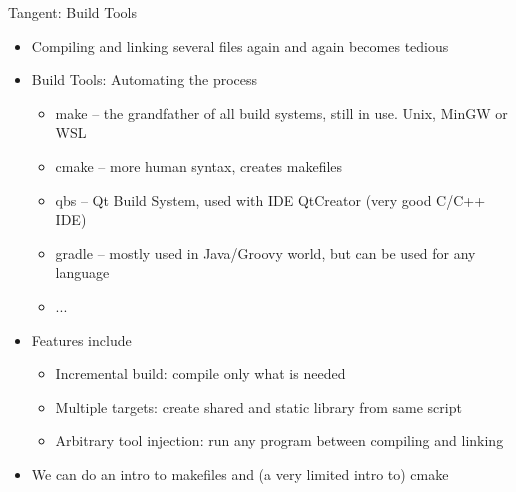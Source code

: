 \begin{frame}{Tangent: Build Tools}
%
\begin{itemize}
\item Compiling and linking several files again and again becomes tedious
\item Build Tools: Automating the process
	\begin{itemize}
	\item make -- the grandfather of all build systems, still in use. Unix, MinGW or WSL
	\item cmake -- more human syntax, creates makefiles
	\item qbs -- Qt Build System, used with IDE QtCreator (very good C/C++ IDE)
	\item gradle -- mostly used in Java/Groovy world, but can be used for any language
	\item ...
	\end{itemize}
\item Features include
	\begin{itemize}
	\item Incremental build: compile only what is needed
	\item Multiple targets: \zB create shared and static library from same script
	\item Arbitrary tool injection: \zB run any program between compiling and linking
	\end{itemize}
\item We can do an intro to makefiles and (a very limited intro to) cmake
\end{itemize}
%
\end{frame}


